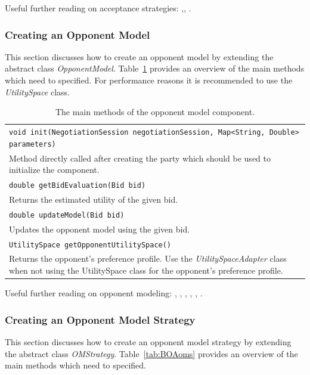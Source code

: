 \documentclass[]{llncs}
\begin{document}
Useful further reading on acceptance strategies: \cite{Baarslag13DSS},\cite{Baarslag13AAMAS}, \cite{ANAC2010KawExt}.

\subsubsection{Creating an Opponent Model}
This section discusses how to create an opponent model by extending the abstract class \textit{OpponentModel}. Table~\ref{tab:BOAom} provides an overview of the main methods which need to specified. For performance reasons it is recommended to use the \textit{UtilitySpace} class.

\begin{table}[h]
\begin{tabular}{m{}}
\hline
\texttt{void init(NegotiationSession negotiationSession, Map<String, Double> parameters)}\\
Method directly called after creating the party which should be used to initialize the component.\\
\hline
\texttt{double getBidEvaluation(Bid bid)}\\
Returns the estimated utility of the given bid.\\
\hline
\texttt{double updateModel(Bid bid)}\\
Updates the opponent model using the given bid.\\
\hline
\texttt{UtilitySpace getOpponentUtilitySpace()}\\
Returns the opponent's preference profile. Use the \textit{UtilitySpaceAdapter} class when not using the UtilitySpace class for the opponent's preference profile.\\
\hline
\end{tabular}
\caption{The main methods of the opponent model component.}
\label{tab:BOAom}
\end{table}

Useful further reading on opponent modeling: \cite{Car08}, \cite{Chen13}, \cite{BaarslagOMSurvey}, \cite{Hin08opp}, \cite{ANAC2014BraveCat}, \cite{Zha15}.

\subsubsection{Creating an Opponent Model Strategy}
This section discusses how to create an opponent model strategy by extending the abstract class \textit{OMStrategy}. Table~\ref{tab:BOAoms} provides an overview of the main methods which need to specified.
\end{document}
